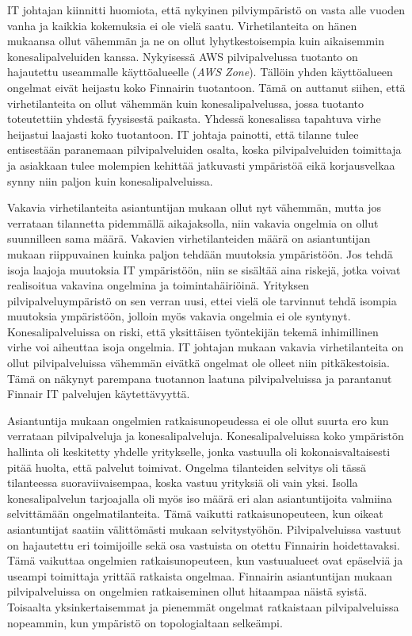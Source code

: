IT johtajan kiinnitti huomiota, että nykyinen pilviympäristö on vasta alle vuoden vanha ja kaikkia kokemuksia ei ole vielä saatu. Virhetilanteita on hänen mukaansa ollut vähemmän ja ne on ollut lyhytkestoisempia kuin aikaisemmin konesalipalveluiden kanssa. Nykyisessä AWS pilvipalvelussa tuotanto on hajautettu useammalle käyttöalueelle (\emph{AWS Zone}). Tällöin yhden käyttöalueen ongelmat eivät heijastu koko Finnairin tuotantoon. Tämä on auttanut siihen, että virhetilanteita on ollut vähemmän kuin konesalipalvelussa, jossa tuotanto toteutettiin yhdestä fyysisestä paikasta. Yhdessä konesalissa tapahtuva virhe heijastui laajasti koko tuotantoon. IT johtaja painotti, että tilanne tulee entisestään paranemaan pilvipalveluiden osalta, koska pilvipalveluiden toimittaja ja asiakkaan tulee molempien kehittää jatkuvasti ympäristöä eikä korjausvelkaa synny niin paljon kuin konesalipalveluissa.

Vakavia virhetilanteita asiantuntijan mukaan ollut nyt vähemmän, mutta jos verrataan tilannetta pidemmällä aikajaksolla, niin vakavia ongelmia on ollut suunnilleen sama määrä. Vakavien virhetilanteiden määrä on asiantuntijan mukaan riippuvainen kuinka paljon tehdään muutoksia ympäristöön. Jos tehdä isoja laajoja muutoksia IT ympäristöön, niin se sisältää aina riskejä, jotka voivat realisoitua vakavina ongelmina ja toimintahäiriöinä. Yrityksen pilvipalveluympäristö on sen verran uusi, ettei vielä ole tarvinnut tehdä isompia muutoksia ympäristöön, jolloin myös vakavia ongelmia ei ole syntynyt. Konesalipalveluissa on riski, että yksittäisen työntekijän tekemä inhimillinen virhe voi aiheuttaa isoja ongelmia. IT johtajan mukaan vakavia virhetilanteita on ollut pilvipalveluissa vähemmän eivätkä ongelmat ole olleet niin pitkäkestoisia. Tämä on näkynyt parempana tuotannon laatuna pilvipalveluissa ja parantanut Finnair IT palvelujen käytettävyyttä.

Asiantuntija mukaan ongelmien ratkaisunopeudessa ei ole ollut suurta ero kun verrataan pilvipalveluja ja konesalipalveluja. Konesalipalveluissa koko ympäristön hallinta oli keskitetty yhdelle yritykselle, jonka vastuulla oli kokonaisvaltaisesti pitää huolta, että palvelut toimivat. Ongelma tilanteiden selvitys oli tässä tilanteessa suoraviivaisempaa, koska vastuu yrityksiä oli vain yksi. Isolla konesalipalvelun tarjoajalla oli myös iso määrä eri alan asiantuntijoita valmiina selvittämään ongelmatilanteita. Tämä vaikutti ratkaisunopeuteen, kun oikeat asiantuntijat saatiin välittömästi mukaan selvitystyöhön. Pilvipalveluissa vastuut on hajautettu eri toimijoille sekä osa vastuista on otettu Finnairin hoidettavaksi. Tämä vaikuttaa ongelmien ratkaisunopeuteen, kun vastuualueet ovat epäselviä ja useampi toimittaja yrittää ratkaista ongelmaa. Finnairin asiantuntijan mukaan pilvipalveluissa on ongelmien ratkaiseminen ollut hitaampaa näistä syistä. Toisaalta yksinkertaisemmat ja pienemmät ongelmat ratkaistaan pilvipalveluissa nopeammin, kun ympäristö on topologialtaan selkeämpi.

